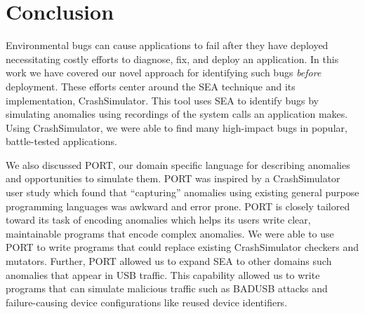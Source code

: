 \chapter{Conclusion}
\label{chap:conclusion}

Environmental bugs can cause applications to fail after they have deployed necessitating costly efforts to diagnose,
fix,
and deploy an application.
In this work we have covered our novel approach for identifying such bugs \textit{before} deployment.
These efforts center around the SEA technique and its implementation,
CrashSimulator.
This tool uses SEA to identify bugs by simulating anomalies using recordings of the system calls an application makes.
Using CrashSimulator,
we were able to find many high-impact bugs in popular, battle-tested applications.

We also discussed PORT,
our domain specific language for describing anomalies and opportunities to simulate them.
PORT was inspired by a CrashSimulator user study which found that ``capturing'' anomalies using existing
general purpose programming languages was awkward and error prone.
PORT is closely tailored toward its task of encoding anomalies which helps its users write clear,
maintainable programs that encode complex anomalies.
We were able to use PORT to write programs that could replace existing CrashSimulator checkers and mutators.
Further, PORT allowed us to expand SEA to other domains such anomalies that appear in USB traffic.
This capability allowed us to write programs that can simulate malicious traffic such as BADUSB attacks
and failure-causing device configurations like reused device identifiers.